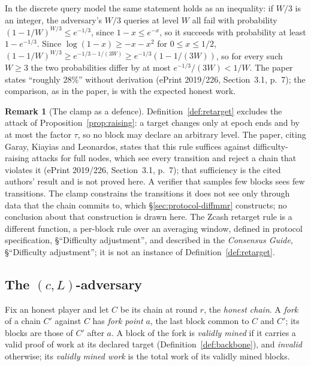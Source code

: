 \documentclass[11pt,a4paper]{article}
\theoremstyle{definition}
\newtheorem{remark}[theorem]{Remark}
\begin{document}
In the discrete query model the same statement holds as an inequality: if
$W / 3$ is an integer, the adversary's $W / 3$ queries at level $W$ all fail
with probability $(1 - 1/W)^{W/3} \le e^{-1/3}$, since $1 - x \le e^{-x}$, so
it succeeds with probability at least $1 - e^{-1/3}$. Since
$\log(1-x)\ge -x-x^2$ for $0\le x\le 1/2$,
$(1-1/W)^{W/3}\ge e^{-1/3-1/(3W)}\ge e^{-1/3}(1-1/(3W))$, so for every
such $W\ge 3$ the two probabilities differ by at most $e^{-1/3}/(3W)<1/W$.
The paper states ``roughly
28\%'' without derivation (ePrint 2019/226, Section~3.1, p.~7); the
comparison, as in the paper, is with the expected honest work.

\begin{remark}[The clamp as a defence]\label{rem:clamp}
Definition~\ref{def:retarget} excludes the attack of
Proposition~\ref{prop:raising}: a target changes only at epoch ends and by
at most the factor $\tau$, so no block may declare an arbitrary level. The
paper, citing Garay, Kiayias and Leonardos, states that this rule suffices
against difficulty-raising attacks for full nodes, which see every
transition and reject a chain that violates it (ePrint 2019/226,
Section~3.1, p.~7); that sufficiency is the cited authors' result and is not
proved here. A verifier that samples few blocks sees few transitions. The
clamp constrains the transitions it does not see only through data that the
chain commits to, which \S\ref{sec:protocol-diffmmr} constructs; no
conclusion about that construction is drawn here. The Zcash retarget rule is
a different function, a per-block rule over an averaging window, defined in
protocol specification, \S``Difficulty adjustment'', and described in the
\emph{Consensus Guide}, \S``Difficulty adjustment''; it is not an instance of
Definition~\ref{def:retarget}.
\end{remark}

\subsection{The \texorpdfstring{$(c, L)$}{(c, L)}-adversary}
\label{sec:model-adversary}

Fix an honest player and let $C$ be its chain at round $r$, the
\emph{honest chain}. A \emph{fork} of a chain $C'$ against $C$ has
\emph{fork point} $a$, the last block common to $C$ and $C'$; its blocks are
those of $C'$ after $a$. A block of the fork is \emph{validly mined} if it
carries a valid proof of work at its declared target
(Definition~\ref{def:backbone}), and \emph{invalid} otherwise; its
\emph{validly mined work} is the total work of its validly mined blocks.
\end{document}
